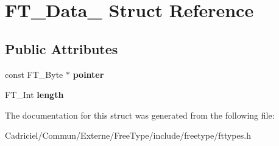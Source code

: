 \hypertarget{struct_f_t___data__}{\section{F\-T\-\_\-\-Data\-\_\- Struct Reference}
\label{struct_f_t___data__}
}
\subsection*{Public Attributes}
\begin{DoxyCompactItemize}
\item 
\hypertarget{struct_f_t___data___a4dea731b8a256b973757e1b8f612b050}{const F\-T\-\_\-\-Byte $\ast$ {\bfseries pointer}}\label{struct_f_t___data___a4dea731b8a256b973757e1b8f612b050}

\item 
\hypertarget{struct_f_t___data___af60c89dccd1852aceb0dc08675aca2fd}{F\-T\-\_\-\-Int {\bfseries length}}\label{struct_f_t___data___af60c89dccd1852aceb0dc08675aca2fd}

\end{DoxyCompactItemize}


The documentation for this struct was generated from the following file\-:\begin{DoxyCompactItemize}
\item 
Cadriciel/\-Commun/\-Externe/\-Free\-Type/include/freetype/fttypes.\-h\end{DoxyCompactItemize}
